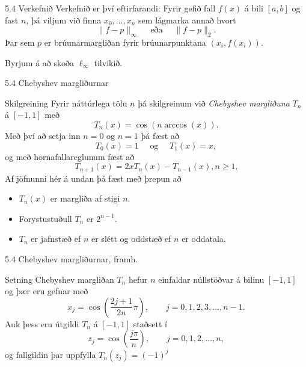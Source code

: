 \begin{frame}{5.4 Verkefnið}
Verkefnið er því eftirfarandi: Fyrir gefið fall $f(x)$ á bili $[a,b]$ og 
fast $n$, þá viljum við finna $x_0,\ldots,x_n$ sem lágmarka annað hvort
$$
  \|f-p\|_\infty \quad \text{ eða } \quad \|f-p\|_2.
$$
Þar sem  $p$ er brúunarmargliðan fyrir brúunarpunktana $(x_i,f(x_i))$.

\pause

Byrjum á að skoða $\ell_\infty$ tilvikið. 
 
\end{frame}

\begin{frame}{5.4 Chebyshev margliðurnar}
 \begin{block}{Skilgreining}
  Fyrir náttúrlega tölu $n$ þá skilgreinum við \emph{Chebyshev margliðuna}
  $T_n$ á $[-1,1]$ með 
  $$
    T_n(x) = \cos(n \arccos(x)).
  $$
 \pause
 Með því að setja inn $n=0$ og $n=1$ þá fæst að 
 $$
  T_0(x) = 1 \quad \text{ og } \quad T_1(x) = x,
 $$
\pause og með hornafallareglunum fæst að 
  $$
    T_{n+1}(x) = 2xT_n(x) - T_{n-1}(x), n \geq 1.
  $$
\pause
 Af jöfnunni hér á undan þá fæst með þrepun að \pause
  \begin{itemize}
   \item $T_n(x)$ er margliða af stigi $n$.\pause
   \item Forystustuðull $T_n$ er $2^{n-1}$.\pause
   \item $T_n$ er jafnstæð ef $n$ er slétt og oddstæð ef $n$ er oddatala.
  \end{itemize}

 \end{block}
\end{frame}

\begin{frame}{5.4 Chebyshev margliðurnar, framh.}
 \begin{block}{Setning}
  Chebyshev margliðan $T_n$ hefur $n$ einfaldar núllstöðvar á bilinu $[-1,1]$ \pause
  og þær eru gefnar með 
  $$
    x_j = \cos\left(\frac{2j+1}{2n}\pi\right),\qquad j=0,1,2,3,\ldots,n-1.
  $$\pause
  Auk þess eru útgildi $T_n$ á $[-1,1]$ staðsett í 
  $$
    z_j = \cos\left( \frac{j\pi}{n}\right),\qquad j=0,1,2,\ldots,n,
  $$
  \pause og fallgildin þar uppfylla $T_n(z_j) = (-1)^j$
 \end{block}

\end{frame}

